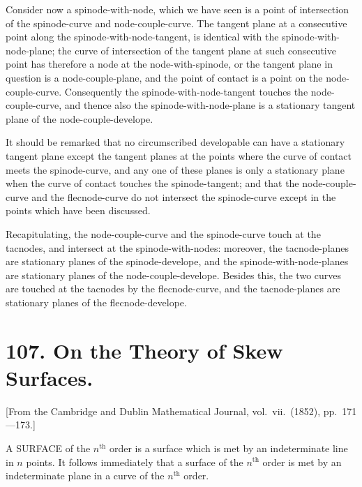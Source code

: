 \documentclass[11pt,a4paper]{book}
\begin{document}
Consider now a spinode-with-node, which we have seen is a point of intersection of the spinode-curve and node-couple-curve. The tangent plane at a consecutive point along the spinode-with-node-tangent, is identical with the spinode-with-node-plane; the curve of intersection of the tangent plane at such consecutive point has therefore a node at the node-with-spinode, or the tangent plane in question is a node-couple-plane, and the point of contact is a point on the node-couple-curve. Consequently the spinode-with-node-tangent touches the node-couple-curve, and thence also the spinode-with-node-plane is a stationary tangent plane of the node-couple-develope.

It should be remarked that no circumscribed developable can have a stationary tangent plane except the tangent planes at the points where the curve of contact meets the spinode-curve, and any one of these planes is only a stationary plane when the curve of contact touches the spinode-tangent; and that the node-couple-curve and the flecnode-curve do not intersect the spinode-curve except in the points which have been discussed.

Recapitulating, the node-couple-curve and the spinode-curve touch at the tacnodes, and intersect at the spinode-with-nodes: moreover, the tacnode-planes are stationary planes of the spinode-develope, and the spinode-with-node-planes are stationary planes of the node-couple-develope. Besides this, the two curves are touched at the tacnodes by the flecnode-curve, and the tacnode-planes are stationary planes of the flecnode-develope.
\clearpage


\section*{107. On the Theory of Skew Surfaces.}

[From the Cambridge and Dublin Mathematical Journal, vol.\ vii.\ (1852), pp.\ 171---173.]

A SURFACE of the $n^{\text{th}}$ order is a surface which is met by an indeterminate line in $n$ points. It follows immediately that a surface of the $n^{\text{th}}$ order is met by an indeterminate plane in a curve of the $n^{\text{th}}$ order.
\end{document}
